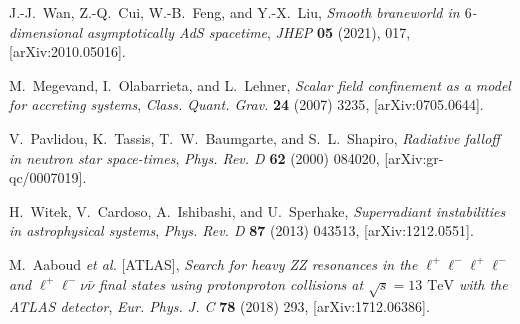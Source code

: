 \begin{thebibliography}{99}
J.-J.~Wan, Z.-Q.~Cui, W.-B.~Feng, and Y.-X.~Liu,
\emph{Smooth braneworld in $6$-dimensional asymptotically AdS spacetime},
{\emph{JHEP} {\bfseries  05} (2021), 017},
[{{\ttfamily arXiv:2010.05016}}].


M.~Megevand, I.~Olabarrieta, and L.~Lehner,
\emph{Scalar field confinement as a model for accreting systems},
{\emph{Class. Quant. Grav.} {\bfseries  24} (2007) 3235},
[{{\ttfamily arXiv:0705.0644}}].


V.~Pavlidou, K.~Tassis, T.~W.~Baumgarte, and S.~L.~Shapiro,
\emph{Radiative falloff in neutron star space-times},
{\emph{Phys. Rev. D} {\bfseries  62} (2000) 084020},
[{{\ttfamily arXiv:gr-qc/0007019}}].


H.~Witek, V.~Cardoso, A.~Ishibashi, and U.~Sperhake,
\emph{Superradiant instabilities in astrophysical systems},
{\emph{Phys. Rev. D} {\bfseries  87} (2013) 043513},
[{{\ttfamily arXiv:1212.0551}}].



M.~Aaboud \textit{et al.} [ATLAS],
\emph{Search for heavy ZZ resonances in the $\ell ^+\ell ^-\ell ^+\ell ^-$ and $\ell ^+\ell ^-\nu \bar{\nu }$ final states using proton\textendash{}proton collisions at $\sqrt{s}= 13$   $\text {TeV}$ with the ATLAS detector},
{\emph{Eur. Phys. J. C} {\bfseries  78} (2018)  293},
[{{\ttfamily arXiv:1712.06386}}].

\end{thebibliography}


